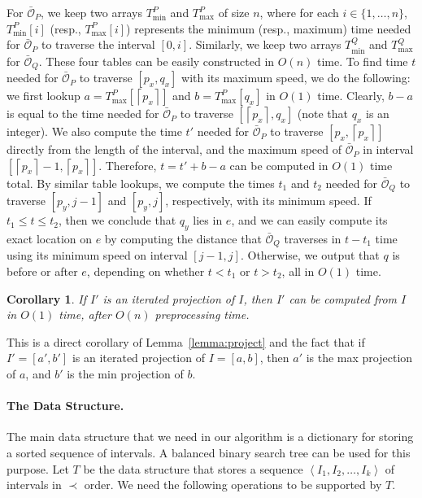 \documentclass[12pt]{dalthesis}
\def\favoritefont{\bfseries \sffamily}
\def\QED{\ensuremath{{\Box}}}
\def\markatright#1{\leavevmode\unskip\nobreak\quad\hspace*{\fill}{#1}}
\newenvironment{proof}
	{\begin{trivlist}\item[\hskip\labelsep{\favoritefont Proof:}]}
	{\markatright{\QED}\end{trivlist}}
\newtheorem{corollary}[theorem]{Corollary}
\newcommand{\lee}{\leqslant}
\newcommand{\ceil}[1]{{\left\lceil{#1}\right\rceil}}
\newcommand{\set}[1]{{\{ #1 \}}}
\newcommand{\seq}[1]{{\left< #1 \right>}}
\newcommand{\CO}{{\mathscr O}}
\newcommand{\COB}{{\bar{\CO}}}
\newcommand{\lei}{\prec}
\begin{document}
\begin{proof}
	For $\COB_P$, we keep two arrays $T^P_{\min}$ and  $T^P_{\max}$ of size $n$,
	where for each $i \in \set{1, \ldots, n}$, 
	$T^P_{\min}[i]$ (resp., $T^P_{\max}[i]$) represents the minimum (resp., maximum) time 
	needed for $\COB_P$ to traverse the interval $[0,i]$.
	Similarly, we keep two arrays $T^Q_{\min}$ and  $T^Q_{\max}$ for $\COB_Q$. 
	These four tables can be easily constructed in $O(n)$ time.
To find time $t$ needed for $\COB_P$ 
	to traverse $[p_x,q_x]$ with its maximum speed, we do the following:
	we first lookup $a=T^P_{\max}[\ceil{p_x}]$ and $b = T^P_{\max}[q_x]$ in $O(1)$ time.
	Clearly, $b-a$ is equal to the time needed for $\COB_P$ to traverse $[\ceil{p_x},q_x]$ 
	(note that $q_x$ is an integer).
	We also compute the time $t'$ needed for $\COB_P$ to traverse $[p_x, \ceil{p_x}]$
	directly from the length of the interval, 
	and the maximum speed of $\COB_P$ in interval $[\ceil{p_x}-1, \ceil{p_x}]$.
	Therefore, $t = t' + b - a$  can be computed in $O(1)$ time total.
	By similar table lookups, we compute the times $t_1$ and $t_2$
	needed for $\COB_Q$ to traverse $[p_y, j-1]$ and $[p_y, j]$, respectively,
	with its minimum speed.
	If $t_1 \lee t \lee t_2$, then we conclude that $q_y$ lies in $e$, 
	and we can easily compute its exact location on $e$ by computing the distance that
	$\COB_Q$ traverses in $t- t_1$ time using its minimum speed on interval $[j-1,j]$.
	Otherwise, we output that $q$ is before or after $e$,
	depending on whether $t < t_1$ or $t > t_2$, all in $O(1)$ time.
\end{proof}


\begin{corollary} \label{cor:project}
	If $I'$ is an iterated projection of $I$, 
	then $I'$ can be computed from $I$ in $O(1)$ time, after $O(n)$ preprocessing time. 
\end{corollary}

\begin{proof}
	This is a direct corollary of Lemma~\ref{lemma:project}
	and the fact that if $I'=[a',b']$ is an iterated projection of $I=[a,b]$,
	then $a'$ is the max projection of $a$, and $b'$ is the min projection of $b$.
\end{proof}


\paragraph{The Data Structure.}
The main data structure that we need in our algorithm is a dictionary 
for storing a sorted sequence of intervals. 
A balanced binary search tree can be used for this purpose.
Let $T$ be the data structure that stores a sequence 
$\seq{I_1, I_2, \ldots, I_k}$ of intervals in $\lei$ order.
We need the following operations to be supported by $T$.
\end{document}
